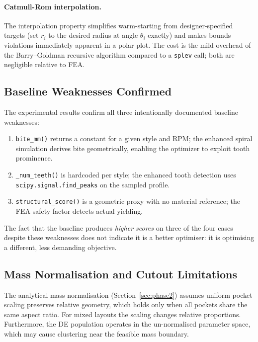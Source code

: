 \documentclass[10pt,twocolumn]{article}
\begin{document}
\paragraph{Catmull-Rom interpolation.}
The interpolation property simplifies warm-starting from designer-specified
targets (set $r_i$ to the desired radius at angle $\theta_i$ exactly) and
makes bounds violations immediately apparent in a polar plot.  The cost is
the mild overhead of the Barry--Goldman recursive algorithm compared to a
\texttt{splev} call; both are negligible relative to FEA.

\subsection{Baseline Weaknesses Confirmed}
\label{sec:discuss_baseline}

The experimental results confirm all three intentionally documented baseline
weaknesses:
\begin{enumerate}
  \item \texttt{bite\_mm()} returns a constant for a given style and RPM;
    the enhanced spiral simulation derives bite geometrically, enabling the
    optimizer to exploit tooth prominence.
  \item \texttt{\_num\_teeth()} is hardcoded per style; the enhanced tooth
    detection uses \texttt{scipy.signal.find\_peaks} on the sampled profile.
  \item \texttt{structural\_score()} is a geometric proxy with no material
    reference; the FEA safety factor detects actual yielding.
\end{enumerate}

The fact that the baseline produces \emph{higher scores} on three of the four
cases despite these weaknesses does not indicate it is a better optimiser: it
is optimising a different, less demanding objective.

\subsection{Mass Normalisation and Cutout Limitations}
\label{sec:discuss_cutout}

The analytical mass normalisation (Section~\ref{sec:phase2}) assumes uniform
pocket scaling preserves relative geometry, which holds only when all pockets
share the same aspect ratio.  For mixed layouts the scaling changes relative
proportions.  Furthermore, the DE population operates in the un-normalised
parameter space, which may cause clustering near the feasible mass boundary.
\end{document}
